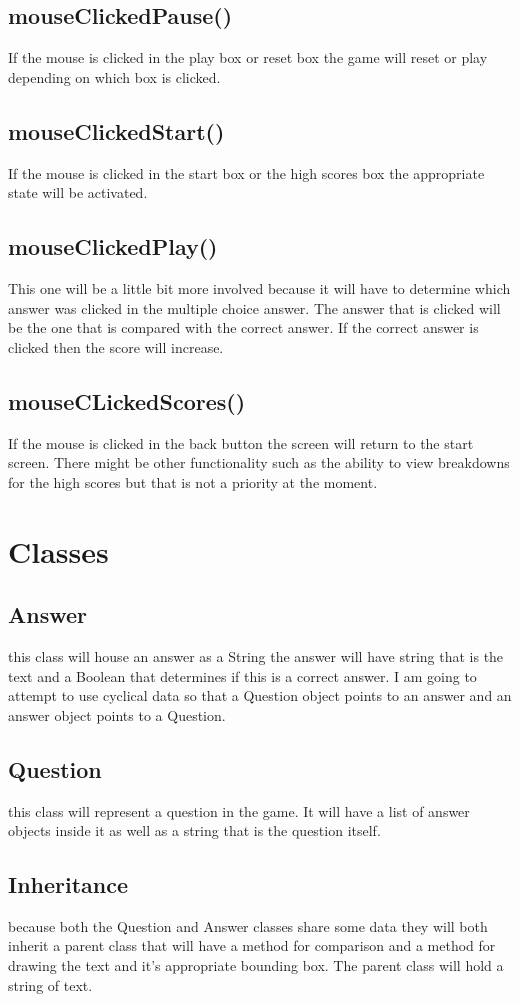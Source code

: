 \documentclass[12 pt]{report}
\begin{document}
\subsection{mouseClickedPause()}
If the mouse is clicked in the play box or reset box the game will reset or play depending on which box is clicked.

\subsection{mouseClickedStart()}
If the mouse is clicked in the start box or the high scores box the appropriate state will be activated.

\subsection{mouseClickedPlay()}
This one will be a little bit more involved because it will have to determine which answer was clicked in the multiple choice answer. The answer that is clicked will be the one that is compared with the correct answer. If the correct answer is clicked then the score will increase.

\subsection{mouseCLickedScores()}
If the mouse is clicked in the back button the screen will return to the start screen. There might be other functionality such as the ability to view breakdowns for the high scores but that is not a priority at the moment.

\section{Classes}
\subsection{Answer}
this class will house an answer as a String the answer will have string that is the text and a Boolean that determines if this is a correct answer. I am going to attempt to use cyclical data so that a Question object points to an answer and an answer object points to a Question. 

\subsection{Question}
this class will represent a question in the game. It will have a list of answer objects inside it as well as a string that is the question itself. 

\subsection{Inheritance}
because both the Question and Answer classes share some data they will both inherit a parent class that will have a method for comparison and a method for drawing the text and it's appropriate bounding box. The parent class will hold a string of text. 
\end{document}
